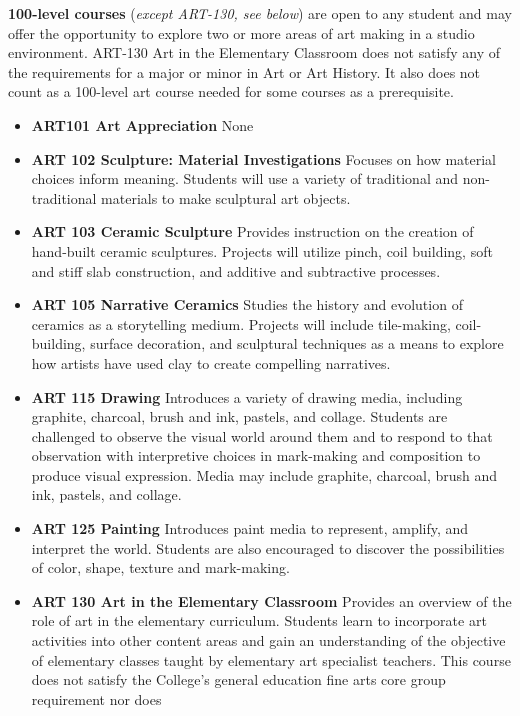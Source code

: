 \documentclass[
  letterpaper,
]{scrbook}
\providecommand{\tightlist}{%
  \setlength{\itemsep}{0pt}\setlength{\parskip}{0pt}}
\begin{document}
\textbf{100-level courses} (\emph{except ART-130, see below}) are open
to any student and may offer the opportunity to explore two or more
areas of art making in a studio environment. ART-130 Art in the
Elementary Classroom does not satisfy any of the requirements for a
major or minor in Art or Art History. It also does not count as a
100-level art course needed for some courses as a prerequisite.

\begin{itemize}
\tightlist
\item
  \textbf{ART101 Art Appreciation} None
\item
  \textbf{ART 102 Sculpture: Material Investigations} Focuses on how
  material choices inform meaning. Students will use a variety of
  traditional and non-traditional materials to make sculptural art
  objects.
\item
  \textbf{ART 103 Ceramic Sculpture} Provides instruction on the
  creation of hand-built ceramic sculptures. Projects will utilize
  pinch, coil building, soft and stiff slab construction, and additive
  and subtractive processes.
\item
  \textbf{ART 105 Narrative Ceramics} Studies the history and evolution
  of ceramics as a storytelling medium. Projects will include
  tile-making, coil-building, surface decoration, and sculptural
  techniques as a means to explore how artists have used clay to create
  compelling narratives.
\item
  \textbf{ART 115 Drawing} Introduces a variety of drawing media,
  including graphite, charcoal, brush and ink, pastels, and collage.
  Students are challenged to observe the visual world around them and to
  respond to that observation with interpretive choices in mark-making
  and composition to produce visual expression. Media may include
  graphite, charcoal, brush and ink, pastels, and collage.
\item
  \textbf{ART 125 Painting} Introduces paint media to represent,
  amplify, and interpret the world. Students are also encouraged to
  discover the possibilities of color, shape, texture and mark-making.
\item
  \textbf{ART 130 Art in the Elementary Classroom} Provides an overview
  of the role of art in the elementary curriculum. Students learn to
  incorporate art activities into other content areas and gain an
  understanding of the objective of elementary classes taught by
  elementary art specialist teachers. This course does not satisfy the
  College's general education fine arts core group requirement nor does

\end{itemize}
\end{document}
